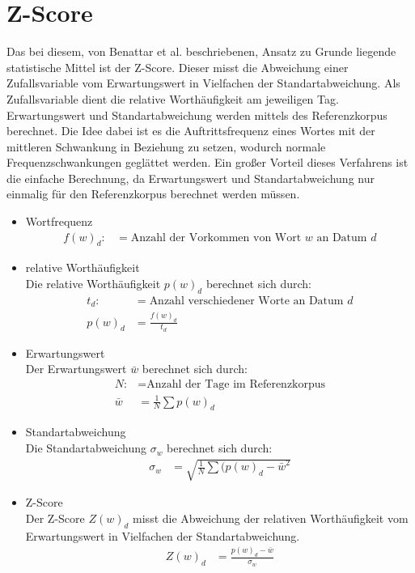 \section{Z-Score}
Das bei diesem, von Benattar et al. \cite{benattar2011trend} beschriebenen, Ansatz zu Grunde liegende statistische Mittel ist der Z-Score. Dieser misst die Abweichung einer Zufallsvariable vom Erwartungswert in Vielfachen der Standartabweichung. Als Zufallsvariable dient die relative Worthäufigkeit am jeweiligen Tag. Erwartungswert und Standartabweichung werden mittels des Referenzkorpus berechnet. Die Idee dabei ist es die Auftrittsfrequenz eines Wortes mit der mittleren Schwankung in Beziehung zu setzen, wodurch normale Frequenzschwankungen geglättet werden. Ein großer Vorteil dieses Verfahrens ist die einfache Berechnung, da Erwartungswert und Standartabweichung nur einmalig für den Referenzkorpus berechnet werden müssen. 

\begin{itemize}
	\item{Wortfrequenz}
		\begin{align*}
			f(w)_d :&= \text{Anzahl der Vorkommen von Wort $w$ an Datum $d$}
		\end{align*}
		
	\item{relative Worthäufigkeit}\\
		Die relative Worthäufigkeit $p(w)_d$ berechnet sich durch:
		\begin{align*}
			t_d   :&= \text{Anzahl verschiedener Worte an Datum $d$} \\
			p(w)_d &= \frac{f(w)_d}{t_d}
		\end{align*}						
		
	\item{Erwartungswert}\\
		Der Erwartungswert $\bar{w}$ berechnet sich durch:
		\begin{align*}
			N      :&= \text{Anzahl der Tage im Referenzkorpus} \\
			\bar{w} &= \frac{1}{N} \sum p(w)_d
		\end{align*}
		
	\item{Standartabweichung}\\
		Die Standartabweichung $\sigma_w$ berechnet sich durch:
		\begin{align*}
			\sigma_w &= \sqrt{\frac{1}{N} \sum (p(w)_d - \bar{w}^2}
		\end{align*}
		
	\item{Z-Score}\\
		Der Z-Score $Z(w)_d$ misst die Abweichung der relativen Worthäufigkeit vom Erwartungswert in Vielfachen der Standartabweichung.
		\begin{align*}
			Z(w)_d &= \frac{p(w)_d - \bar{w}}{\sigma_w}
		\end{align*}
		
\end{itemize}

